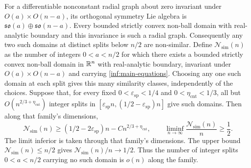 \begin{lemma}
\label{inf:similarity-classes}
For a differentiable nonconstant radial graph about zero invariant
under $O(a)\times O(n-a)$, its orthogonal symmetry Lie algebra is
$\mathfrak{so}(a)\oplus\mathfrak{so}(n-a)$.
Every bounded strictly convex non-ball domain with real-analytic
boundary and this invariance is such a radial graph. Consequently
any two such domains at distinct splits below $n/2$ are non-similar.
Define $\mathcal N_{\mathrm{sim}}(n)$ as the number of integers
$0<a<n/2$ for which there exists a bounded strictly convex non-ball
domain in $\mathbb{R}^n$ with real-analytic boundary, invariant under
$O(a)\times O(n-a)$ and carrying \eqref{inf:main-equations}.
Choosing any one such domain at each split gives this many
similarity classes, independently of the choices.
Suppose that, for every fixed $0<\varepsilon_{\mathrm{sp}}<1/4$
and $0<\eta_{\mathrm{cnt}}<1/3$, all but
$O(n^{2/3+\eta_{\mathrm{cnt}}})$ integer splits in
$[\varepsilon_{\mathrm{sp}}n,(1/2-\varepsilon_{\mathrm{sp}})n]$
give such domains. Then along that family's dimensions,
\[
 \mathcal N_{\mathrm{sim}}(n)\ge
 (1/2-2\varepsilon_{\mathrm{sp}})n-Cn^{2/3+\eta_{\mathrm{cnt}}},\qquad
 \liminf_{n\to\infty}\frac{\mathcal N_{\mathrm{sim}}(n)}n\ge\frac12.
\]
The limit inferior is taken through that family's dimensions.
The upper bound $\mathcal N_{\mathrm{sim}}(n)\le n/2$ gives
$\mathcal N_{\mathrm{sim}}(n)/n\to1/2$. Thus the number of integer
splits $0<a<n/2$ carrying no such domain is $o(n)$ along the family.
\end{lemma}

